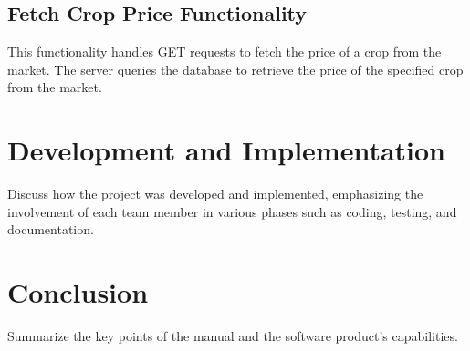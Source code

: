 \documentclass[12pt]{article}
\begin{document}
\subsection{Fetch Crop Price Functionality}
This functionality handles GET requests to fetch the price of a crop from the market. The server queries the database to retrieve the price of the specified crop from the market.

\section{Development and Implementation}
Discuss how the project was developed and implemented, emphasizing the involvement of each team member in various phases such as coding, testing, and documentation.

\section{Conclusion}
Summarize the key points of the manual and the software product's capabilities.
\end{document}
